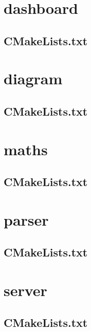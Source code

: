 \section{dashboard}

\subsection{CMakeLists.txt}


\section{diagram}

\subsection{CMakeLists.txt}


\section{maths}

\subsection{CMakeLists.txt}


\section{parser}

\subsection{CMakeLists.txt}


\section{server}

\subsection{CMakeLists.txt}


